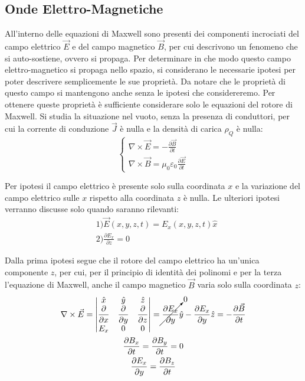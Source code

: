 \documentclass{article}
\numberwithin{equation}{subsection}
\begin{document}
\subsection{Onde Elettro-Magnetiche}
All'interno delle equazioni di Maxwell sono presenti dei componenti incrociati del campo elettrico $\vec{E}$ e del campo magnetico $\vec{B}$, per cui descrivono un fenomeno 
che si auto-sostiene, ovvero si propaga. Per determinare in che modo questo campo elettro-magnetico si propaga nello spazio, si considerano le necessarie ipotesi per poter 
descrivere semplicemente le sue proprietà. Da notare che le proprietà di questo campo si mantengono anche senza le ipotesi che considereremo. Per ottenere queste proprietà 
è sufficiente considerare solo le equazioni del rotore di Maxwell. Si studia la situazione nel vuoto, senza la presenza di conduttori, per cui la corrente di conduzione $\vec{J}$ 
è nulla e la densità di carica $\rho_Q$ è nulla: 
\begin{equation*}
    \begin{cases}
        \nabla\times\vec{E}=-\displaystyle\frac{\partial \vec{B}}{\partial t}\\
        \nabla\times\vec{B}=\mu_0\varepsilon_0\displaystyle\frac{\partial \vec{E}}{\partial t}
    \end{cases}
\end{equation*}

Per ipotesi il campo elettrico è presente solo sulla coordinata $x$ e la variazione del campo elettrico sulle $x$ rispetto alla coordinata $z$ è nulla. Le ulteriori ipotesi 
verranno discusse solo quando saranno rilevanti:
\begin{align*}
    &1)\vec{E}(x,y,z,t)=E_x(x,y,z,t)\hat{x}\\
    &2)\displaystyle\frac{\partial E_x}{\partial z}=0
\end{align*}

Dalla prima ipotesi segue che il rotore del campo elettrico ha un'unica componente $z$, per cui, per il principio di identità dei polinomi e per la terza l'equazione di Maxwell, 
anche il campo magnetico $\vec{B}$ varia solo sulla coordinata $z$: 
\begin{gather*}
    \nabla\times\vec{E}=
    \begin{vmatrix}
        \hat{x} &\hat{y}&\hat{z}\\
        \displaystyle\frac{\partial}{\partial x}&\displaystyle\frac{\partial}{\partial y}&\displaystyle\frac{\partial}{\partial z}\\
        E_x&0&0
    \end{vmatrix}=
    \displaystyle\cancelto{0}{\frac{\partial E_x}{\partial y}}\hat{y}-\frac{\partial E_x}{\partial y}\hat{z}=-\frac{\partial \vec{B}}{\partial t}\\
    \displaystyle\frac{\partial B_x}{\partial t}=\frac{\partial B_y}{\partial t}=0\\
    \displaystyle\frac{\partial E_x}{\partial y}=\frac{\partial B_z}{\partial t}
\end{gather*}
\end{document}
